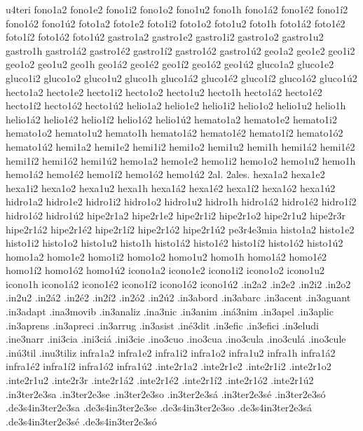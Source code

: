 {u4teri
fono1a2 fono1e2 fono1i2 fono1o2 fono1u2 fono1h
fono1^^e12 fono1^^e92 fono1^^ed2 fono1^^f32 fono1^^fa2
foto1a2 foto1e2 foto1i2 foto1o2 foto1u2 foto1h
foto1^^e12 foto1^^e92 foto1^^ed2 foto1^^f32 foto1^^fa2
gastro1a2 gastro1e2 gastro1i2 gastro1o2 gastro1u2 gastro1h
gastro1^^e12 gastro1^^e92 gastro1^^ed2 gastro1^^f32 gastro1^^fa2
geo1a2 geo1e2 geo1i2 geo1o2 geo1u2 geo1h
geo1^^e12 geo1^^e92 geo1^^ed2 geo1^^f32 geo1^^fa2
gluco1a2 gluco1e2 gluco1i2 gluco1o2 gluco1u2 gluco1h
gluco1^^e12 gluco1^^e92 gluco1^^ed2 gluco1^^f32 gluco1^^fa2
hecto1a2 hecto1e2 hecto1i2 hecto1o2 hecto1u2 hecto1h
hecto1^^e12 hecto1^^e92 hecto1^^ed2 hecto1^^f32 hecto1^^fa2
helio1a2 helio1e2 helio1i2 helio1o2 helio1u2 helio1h
helio1^^e12 helio1^^e92 helio1^^ed2 helio1^^f32 helio1^^fa2
hemato1a2 hemato1e2 hemato1i2 hemato1o2 hemato1u2 hemato1h
hemato1^^e12 hemato1^^e92 hemato1^^ed2 hemato1^^f32 hemato1^^fa2
hemi1a2 hemi1e2 hemi1i2 hemi1o2 hemi1u2 hemi1h
hemi1^^e12 hemi1^^e92 hemi1^^ed2 hemi1^^f32 hemi1^^fa2
hemo1a2 hemo1e2 hemo1i2 hemo1o2 hemo1u2 hemo1h
hemo1^^e12 hemo1^^e92 hemo1^^ed2 hemo1^^f32 hemo1^^fa2
2al. 2ales.
hexa1a2 hexa1e2 hexa1i2 hexa1o2 hexa1u2 hexa1h
hexa1^^e12 hexa1^^e92 hexa1^^ed2 hexa1^^f32 hexa1^^fa2
hidro1a2 hidro1e2 hidro1i2 hidro1o2 hidro1u2 hidro1h
hidro1^^e12 hidro1^^e92 hidro1^^ed2 hidro1^^f32 hidro1^^fa2
hipe2r1a2 hipe2r1e2 hipe2r1i2 hipe2r1o2 hipe2r1u2 hipe2r3r
hipe2r1^^e12 hipe2r1^^e92 hipe2r1^^ed2 hipe2r1^^f32 hipe2r1^^fa2
pe3r4e3mia
histo1a2 histo1e2 histo1i2 histo1o2 histo1u2 histo1h
histo1^^e12 histo1^^e92 histo1^^ed2 histo1^^f32 histo1^^fa2
homo1a2 homo1e2 homo1i2 homo1o2 homo1u2 homo1h
homo1^^e12 homo1^^e92 homo1^^ed2 homo1^^f32 homo1^^fa2
icono1a2 icono1e2 icono1i2 icono1o2 icono1u2 icono1h
icono1^^e12 icono1^^e92 icono1^^ed2 icono1^^f32 icono1^^fa2
.in2a2 .in2e2 .in2i2 .in2o2 .in2u2
.in2^^e12 .in2^^e92 .in2^^ed2 .in2^^f32 .in2^^fa2
.in3abord
.in3abarc
.in3acent
.in3aguant
.in3adapt
.ina3movib
.in3analiz
.ina3nic
.in3anim
.in^^e13nim
.in3apel
.in3aplic
.in3aprens
.in3apreci
.in3arrug
.in3asist
.in^^e93dit
.in3efic
.in3efici
.in3eludi
.ine3narr
.ini3cia .ini3ci^^e1 .ini3cie
.ino3cuo .ino3cua
.ino3cula .ino3cul^^e1 .ino3cule
.in^^fa3til
.inu3tiliz
infra1a2 infra1e2 infra1i2 infra1o2 infra1u2 infra1h
infra1^^e12 infra1^^e92 infra1^^ed2 infra1^^f32 infra1^^fa2
.inte2r1a2 .inte2r1e2 .inte2r1i2 .inte2r1o2 .inte2r1u2 .inte2r3r
.inte2r1^^e12 .inte2r1^^e92 .inte2r1^^ed2 .inte2r1^^f32 .inte2r1^^fa2
.in3ter2e3sa .in3ter2e3se .in3ter2e3so
.in3ter2e3s^^e1 .in3ter2e3s^^e9 .in3ter2e3s^^f3
.de3s4in3ter2e3sa .de3s4in3ter2e3se .de3s4in3ter2e3so
.de3s4in3ter2e3s^^e1 .de3s4in3ter2e3s^^e9 .de3s4in3ter2e3s^^f3
}
